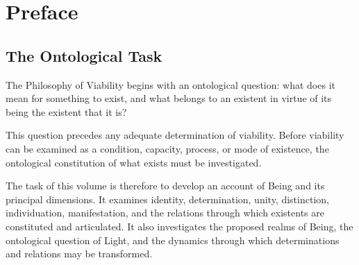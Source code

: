 %
%
%
%
%
%


\cleardoublepage

\chapter*{Preface}
{}



\section*{The Ontological Task}

The Philosophy of Viability begins with an ontological
question: what does it mean for something to exist,
and what belongs to an existent in virtue of its being
the existent that it is?

This question precedes any adequate determination
of viability. Before viability can be examined as
a condition, capacity, process, or mode of existence,
the ontological constitution of what exists must
be investigated.

The task of this volume is therefore to develop
an account of Being and its principal dimensions.
It examines identity, determination, unity,
distinction, individuation, manifestation, and
the relations through which existents are constituted
and articulated. It also investigates the proposed
realms of Being, the ontological question of Light,
and the dynamics through which determinations
and relations may be transformed.

